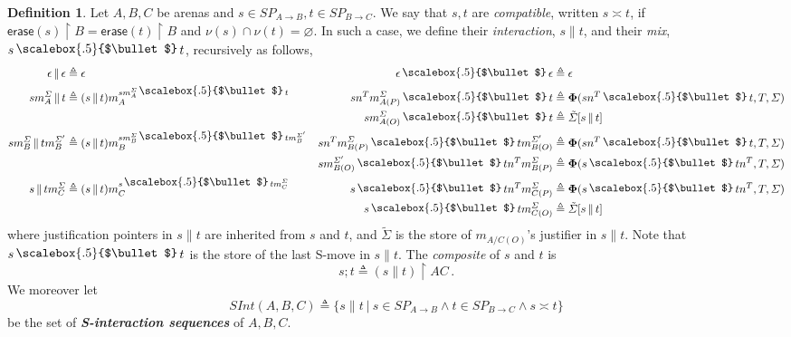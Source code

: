 \documentclass{CSML}
\theoremstyle{definition}\newtheorem{definition}[thm]{Definition}
\theoremstyle{definition}\newtheorem{example}[thm]{Example}
\theoremstyle{definition}\newtheorem{proposition}[thm]{Proposition}
\theoremstyle{definition}\newtheorem{lemma}[thm]{Lemma}
\theoremstyle{definition}\newtheorem{theorem}[thm]{Theorem}
\theoremstyle{definition}\newtheorem{corollary}[thm]{Corollary}
\theoremstyle{definition}\newtheorem{remark}[thm]{Remark}
\renewcommand\Sigma{\varSigma}
\newcommand\Tau{T}
\newcommand\defn{\triangleq}
\newcommand\Erase[1]{\mathsf{erase}(#1)}
\newcommand\arr{\rightarrow}
\newcommand\rest{\upharpoonright}
\newcommand\iseq{\mathop{\|}}
\newcommand\mix{\,\raisebox{.25ex}{\scalebox{.5}{$\bullet$}}\,}
\newcommand\ee\epsilon
\newcommand\nice{\boldsymbol\Phi}
\newcommand\Splays[1]{\mathit{SP}_{#1}}
\newcommand\Sinter[1]{\mathit{SInt}(#1)}
\newcommand\boldemph[1]{\emph{\textbf{#1}}}
\newcommand\erase[1]{\Erase{#1}}
\begin{document}
\begin{definition}
Let $A,B,C$ be arenas and $s\in\Splays{A\arr B},t\in\Splays{B\arr C}$. We say that $s,t$ are \emph{compatible}, written $s\asymp t$, if $\erase{s}\rest B=\erase{t}\rest B$ and $\nu(s)\cap\nu(t)=\varnothing$. In such a case, we define their \emph{interaction}, $s\iseq t$, and their \emph{mix}, $s\mix t$, recursively as follows,
\begin{align*}
\ee\iseq\ee                 &\defn \ee
& \ee\mix\ee                          &\defn \ee \\
sm_A^\Sigma\iseq t            &\defn (s\iseq t)m_A^{sm_A^\Sigma\mix t}
& sn^\Tau m_{A(P)}^\Sigma\mix t                 &\defn \nice(sn^\Tau\mix t,\Tau,\Sigma) \\
&& sm_{A(O)}^\Sigma\mix t                 &\defn \tilde\Sigma[s\iseq t] \\
sm_B^\Sigma\iseq tm_B^{\Sigma'}    &\defn (s\iseq t)m_B^{sm_B^\Sigma\mix tm_B^{\Sigma'}}
& sn^\Tau m_{B(P)}^\Sigma\mix tm_{B(O)}^{\Sigma'}     &\defn \nice(sn^\Tau\mix t,\Tau,\Sigma) \\
&& s m_{B(O)}^{\Sigma'}\mix tn^\Tau m_{B(P)}^\Sigma     &\defn \nice(s\mix tn^\Tau,\Tau,\Sigma) \\
s\iseq tm_C^\Sigma            &\defn (s\iseq t)m_C^{s\mix tm_C^\Sigma}
& s\mix tn^\Tau m_{C(P)}^\Sigma                 &\defn \nice(s\mix tn^\Tau,\Tau,\Sigma) \\
&& s\mix tm_{C(O)}^\Sigma                 &\defn \tilde\Sigma[s\iseq t]
\end{align*}
where 
justification pointers in $s\iseq t$ are inherited from $s$ and $t$, and
$\tilde\Sigma$ is the store of $m_{A/C(O)}$'s justifier in $s\iseq t$. 
Note that $s\mix t$ is the store of the last S-move in $s\iseq t$. The \emph{composite} of $s$ and $t$ is
\[ s; t \defn (s\iseq t)\upharpoonright AC\,. \]
We moreover let
\[ \Sinter{A,B,C} \defn \{ s\iseq t\ |\ s\in\Splays{A\arr B}\land t\in\Splays{B\arr C}\land s\asymp t \} \]
be the set of \boldemph{S-interaction sequences} of $A,B,C$.
\end{definition}
\end{document}
